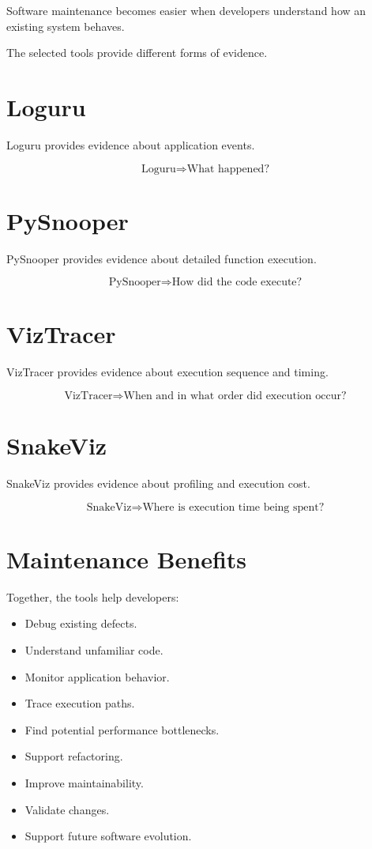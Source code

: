 \documentclass[12pt,a4paper]{report}
\begin{document}
Software maintenance becomes easier when developers understand how an
existing system behaves.

The selected tools provide different forms of evidence.

\section{Loguru}

Loguru provides evidence about application events.

\[
\text{Loguru} \Rightarrow \text{What happened?}
\]

\section{PySnooper}

PySnooper provides evidence about detailed function execution.

\[
\text{PySnooper} \Rightarrow \text{How did the code execute?}
\]

\section{VizTracer}

VizTracer provides evidence about execution sequence and timing.

\[
\text{VizTracer} \Rightarrow
\text{When and in what order did execution occur?}
\]

\section{SnakeViz}

SnakeViz provides evidence about profiling and execution cost.

\[
\text{SnakeViz} \Rightarrow
\text{Where is execution time being spent?}
\]

\section{Maintenance Benefits}

Together, the tools help developers:

\begin{itemize}
    \item Debug existing defects.
    \item Understand unfamiliar code.
    \item Monitor application behavior.
    \item Trace execution paths.
    \item Find potential performance bottlenecks.
    \item Support refactoring.
    \item Improve maintainability.
    \item Validate changes.
    \item Support future software evolution.
\end{itemize}
\end{document}
